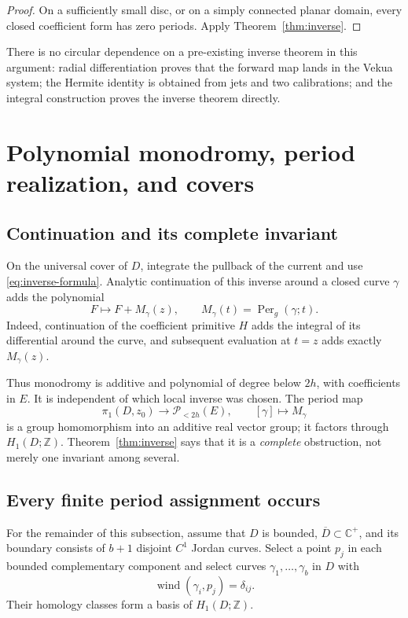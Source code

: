 \documentclass[11pt,a4paper]{article}
\numberwithin{equation}{section}
\theoremstyle{definition}
\theoremstyle{remark}
\newcommand{\C}{\mathbb C}
\newcommand{\Z}{\mathbb Z}
\newcommand{\PP}{\mathscr P_{<2h}(E)}
\newcommand{\Per}{\operatorname{Per}}
\begin{document}
\begin{proof}
On a sufficiently small disc, or on a simply connected planar domain, every
closed coefficient form has zero periods. Apply Theorem~\ref{thm:inverse}.
\end{proof}

There is no circular dependence on a pre-existing inverse theorem in this
argument: radial differentiation proves that the forward map lands in the
Vekua system; the Hermite identity is obtained from jets and two calibrations;
and the integral construction proves the inverse theorem directly.

\section{Polynomial monodromy, period realization, and covers}
\label{sec:cokernel}

\subsection{Continuation and its complete invariant}

On the universal cover of $D$, integrate the pullback of the current and use
\eqref{eq:inverse-formula}. Analytic continuation of this inverse around a
closed curve $\gamma$ adds the polynomial
\begin{equation}\label{eq:monodromy}
 F\longmapsto F+M_\gamma(z),\qquad
 M_\gamma(t)=\Per_g(\gamma;t).
\end{equation}
Indeed, continuation of the coefficient primitive $H$ adds the integral of
its differential around the curve, and subsequent evaluation at $t=z$ adds
exactly $M_\gamma(z)$.

Thus monodromy is additive and polynomial of degree below $2h$, with coefficients
in $E$. It is independent of which local inverse was chosen. The period map
\[
 \pi_1(D,z_0)\longrightarrow\PP,
 \qquad [\gamma]\longmapsto M_\gamma
\]
is a group homomorphism into an additive real vector group; it factors through
$H_1(D;\Z)$. Theorem~\ref{thm:inverse} says that it is a \emph{complete}
obstruction, not merely one invariant among several.

\subsection{Every finite period assignment occurs}

For the remainder of this subsection, assume that $D$ is bounded,
$\overline D\subset\C^+$, and its boundary consists of $b+1$ disjoint
$C^1$ Jordan curves. Select a point $p_j$ in each bounded complementary
component and select curves $\gamma_1,\ldots,\gamma_b$ in $D$ with
\[
 \operatorname{wind}(\gamma_i,p_j)=\delta_{ij}.
\]
Their homology classes form a basis of $H_1(D;\Z)$.
\end{document}
